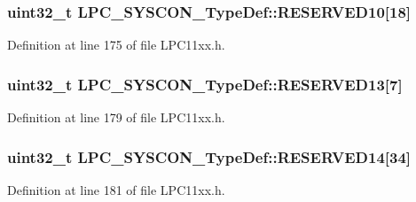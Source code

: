 \subsubsection[{\texorpdfstring{R\+E\+S\+E\+R\+V\+E\+D10}{RESERVED10}}]{\setlength{\rightskip}{0pt plus 5cm}uint32\+\_\+t L\+P\+C\+\_\+\+S\+Y\+S\+C\+O\+N\+\_\+\+Type\+Def\+::\+R\+E\+S\+E\+R\+V\+E\+D10\mbox{[}18\mbox{]}}\hypertarget{group___l_p_c11xx___definitions_ga60a24e7e1ad0983bd355423fd7119da7}{}\label{group___l_p_c11xx___definitions_ga60a24e7e1ad0983bd355423fd7119da7}


Definition at line 175 of file L\+P\+C11xx.\+h.

\subsubsection[{\texorpdfstring{R\+E\+S\+E\+R\+V\+E\+D13}{RESERVED13}}]{\setlength{\rightskip}{0pt plus 5cm}uint32\+\_\+t L\+P\+C\+\_\+\+S\+Y\+S\+C\+O\+N\+\_\+\+Type\+Def\+::\+R\+E\+S\+E\+R\+V\+E\+D13\mbox{[}7\mbox{]}}\hypertarget{group___l_p_c11xx___definitions_ga6d48056afe2fd1921e2ce8669c3ffab7}{}\label{group___l_p_c11xx___definitions_ga6d48056afe2fd1921e2ce8669c3ffab7}


Definition at line 179 of file L\+P\+C11xx.\+h.

\subsubsection[{\texorpdfstring{R\+E\+S\+E\+R\+V\+E\+D14}{RESERVED14}}]{\setlength{\rightskip}{0pt plus 5cm}uint32\+\_\+t L\+P\+C\+\_\+\+S\+Y\+S\+C\+O\+N\+\_\+\+Type\+Def\+::\+R\+E\+S\+E\+R\+V\+E\+D14\mbox{[}34\mbox{]}}\hypertarget{group___l_p_c11xx___definitions_ga044755f7a4c5447c75d2266dfe529b19}{}\label{group___l_p_c11xx___definitions_ga044755f7a4c5447c75d2266dfe529b19}


Definition at line 181 of file L\+P\+C11xx.\+h.

